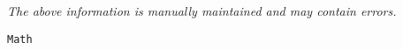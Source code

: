 \label{pkg:math}

{\tiny \it The above information is manually maintained and may contain errors.}
\begin{verbatim}
Math
\end{verbatim}
